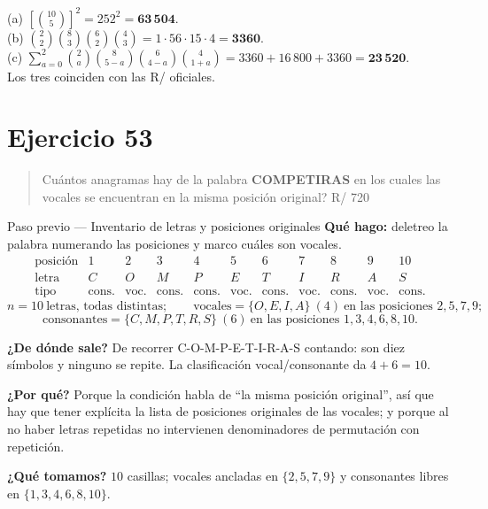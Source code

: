 \documentclass[11pt]{article}
\begin{document}
\begin{resp}
(a) $\displaystyle \left[\binom{10}{5}\right]^2=252^2=\mathbf{63\,504}$.\\[4pt]
(b) $\displaystyle \binom{2}{2}\binom{8}{3}\binom{6}{2}\binom{4}{3}=1\cdot 56\cdot 15\cdot 4=\mathbf{3360}$.\\[4pt]
(c) $\displaystyle \sum_{a=0}^{2}\binom{2}{a}\binom{8}{5-a}\binom{6}{4-a}\binom{4}{1+a}=3360+16\,800+3360=\mathbf{23\,520}$.\\
Los tres coinciden con las R/ oficiales.
\end{resp}

\section*{Ejercicio 53}

\begin{quote}
Cu\'antos anagramas hay de la palabra \textbf{COMPETIRAS} en los cuales las vocales se encuentran en la
misma posici\'on original? \hfill R/ 720
\end{quote}

\begin{paso}{Paso previo --- Inventario de letras y posiciones originales}
\textbf{Qu\'e hago:} deletreo la palabra numerando las posiciones y marco cu\'ales son vocales.
\[
\begin{array}{c|c|c|c|c|c|c|c|c|c|c}
\text{posici\'on} & 1 & 2 & 3 & 4 & 5 & 6 & 7 & 8 & 9 & 10\\ \hline
\text{letra} & C & O & M & P & E & T & I & R & A & S\\ \hline
\text{tipo} & \text{cons.} & \text{voc.} & \text{cons.} & \text{cons.} & \text{voc.} & \text{cons.} & \text{voc.} & \text{cons.} & \text{voc.} & \text{cons.}
\end{array}
\]
\[
n=10\ \text{letras, todas distintas};\qquad
\text{vocales}=\{O,E,I,A\}\ (4)\ \text{en las posiciones } 2,5,7,9;
\]
\[
\text{consonantes}=\{C,M,P,T,R,S\}\ (6)\ \text{en las posiciones } 1,3,4,6,8,10 .
\]

\textbf{¿De d\'onde sale?} De recorrer C-O-M-P-E-T-I-R-A-S contando: son diez s\'imbolos y ninguno se repite.
La clasificaci\'on vocal/consonante da $4+6=10$.

\textbf{¿Por qu\'e?} Porque la condici\'on habla de ``la misma posici\'on original'', as\'i que hay que tener
expl\'icita la lista de posiciones originales de las vocales; y porque al no haber letras repetidas no
intervienen denominadores de permutaci\'on con repetici\'on.

\textbf{¿Qu\'e tomamos?} $10$ casillas; vocales ancladas en $\{2,5,7,9\}$ y consonantes libres en
$\{1,3,4,6,8,10\}$.
\end{paso}
\end{document}
